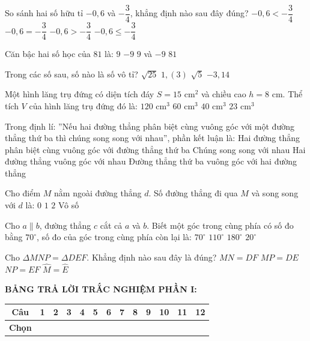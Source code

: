 \documentclass[12pt,a4paper]{article}
\begin{document}
\begin{ex}
So sánh hai số hữu tỉ $-0{,}6$ và $-\dfrac{3}{4}$, khẳng định nào sau đây đúng?
\choice
{$-0{,}6 < -\dfrac{3}{4}$}
{$-0{,}6 = -\dfrac{3}{4}$}
{\True $-0{,}6 > -\dfrac{3}{4}$}
{$-0{,}6 \le -\dfrac{3}{4}$}
\end{ex}

\begin{ex}
Căn bậc hai số học của $81$ là:
\choice
{\True $9$}
{$-9$}
{$9$ và $-9$}
{$81$}
\end{ex}

\begin{ex}
Trong các số sau, số nào là số vô tỉ?
\choice
{$\sqrt{25}$}
{$1{,}(3)$}
{\True $\sqrt{5}$}
{$-3{,}14$}
\end{ex}

\begin{ex}
Một hình lăng trụ đứng có diện tích đáy $S = 15\text{ cm}^2$ và chiều cao $h = 8\text{ cm}$. Thể tích $V$ của hình lăng trụ đứng đó là:
\choice
{\True $120\text{ cm}^3$}
{$60\text{ cm}^3$}
{$40\text{ cm}^3$}
{$23\text{ cm}^3$}
\end{ex}

\begin{ex}
Trong định lí: ''Nếu hai đường thẳng phân biệt cùng vuông góc với một đường thẳng thứ ba thì chúng song song với nhau'', phần kết luận là:
\choice
{Hai đường thẳng phân biệt cùng vuông góc với đường thẳng thứ ba}
{\True Chúng song song với nhau}
{Hai đường thẳng vuông góc với nhau}
{Đường thẳng thứ ba vuông góc với hai đường thẳng}
\end{ex}

\begin{ex}
Cho điểm $M$ nằm ngoài đường thẳng $d$. Số đường thẳng đi qua $M$ và song song với $d$ là:
\choice
{$0$}
{\True $1$}
{$2$}
{Vô số}
\end{ex}

\begin{ex}
Cho $a \parallel b$, đường thẳng $c$ cắt cả $a$ và $b$. Biết một góc trong cùng phía có số đo bằng $70^\circ$, số đo của góc trong cùng phía còn lại là:
\choice
{$70^\circ$}
{\True $110^\circ$}
{$180^\circ$}
{$20^\circ$}
\end{ex}

\begin{ex}
Cho $\Delta MNP = \Delta DEF$. Khẳng định nào sau đây là đúng?
\choice
{$MN = DF$}
{$MP = DE$}
{\True $NP = EF$}
{$\widehat{M} = \widehat{E}$}
\end{ex}


\vspace{1mm}
\noindent\textbf{BẢNG TRẢ LỜI TRẮC NGHIỆM PHẦN I:}
\begin{center}
\begin{tabular}{|c|c|c|c|c|c|c|c|c|c|c|c|c|}
\hline
\textbf{Câu} & \textbf{1} & \textbf{2} & \textbf{3} & \textbf{4} & \textbf{5} & \textbf{6} & \textbf{7} & \textbf{8} & \textbf{9} & \textbf{10} & \textbf{11} & \textbf{12} \\
\hline
\textbf{Chọn} & \rule{0pt}{0.65cm} & & & & & & & & & & & \\
\hline
\end{tabular}
\end{center}
\vspace{2mm}
\end{document}
